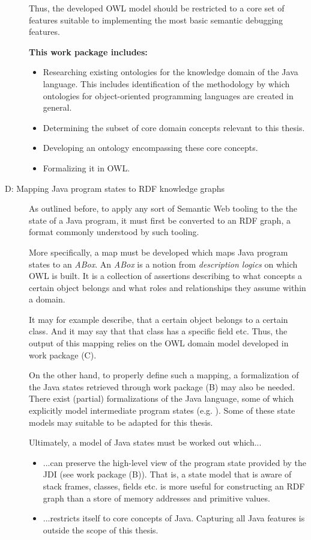 \documentclass[
	english,
	accentcolor=9c,%
  marginpar=0cm %
	]{tudapub}
\begin{document}
\begin{description}
    Thus, the developed OWL model should be restricted to a core set of features
    suitable to implementing the most basic semantic debugging features.

    \textbf{This work package includes:}
    \begin{itemize}
      \item Researching existing ontologies for the knowledge domain of the Java
        language. This includes identification of the methodology by which
        ontologies for object-oriented programming languages are created in
        general.
      \item Determining the subset of core domain concepts relevant to this thesis.
      \item Developing an ontology encompassing these core concepts.
      \item Formalizing it in OWL.
    \end{itemize}
  \item[D: Mapping Java program states to RDF knowledge graphs]
    As outlined before, to apply any sort of Semantic Web tooling to the the
    state of a Java program, it must first be converted to an RDF graph, a
    format commonly understood by such tooling.

    More specifically, a map must be developed which maps Java program states
    to an \emph{ABox}. %
    An \emph{ABox} is a notion from \emph{description logics} on which OWL is
    built.
    It is a collection of assertions describing to what concepts a
    certain object belongs and what roles and relationships they assume within
    a domain.

    It may for example describe, that a certain object belongs to a
    certain class. And it may say that that class has a specific field etc.
    Thus, the output of this mapping relies on the OWL domain model developed
    in work package (C).

    On the other hand, to properly define such a mapping, a formalization of
    the Java states retrieved through work package (B) may also be needed.
    There exist (partial) formalizations of the Java language, some of which
    explicitly model intermediate program states
    (e.g. \cite{feitosa2018formal,bogdanas2015kjava}).
    Some of these state models may suitable to be adapted for this thesis.

    Ultimately, a model of Java states must be worked out which...
    \begin{itemize}
      \item ...can preserve the high-level view of the program state provided by
        the JDI (see work package (B)).
        That is, a state model that is aware of stack frames, classes, fields etc.
        is more useful for constructing an RDF graph than a store of memory
        addresses and primitive values.
      \item ...restricts itself to core concepts of Java.
        Capturing all Java features is outside the scope of this thesis.
    \end{itemize}


\end{description}
\end{document}
